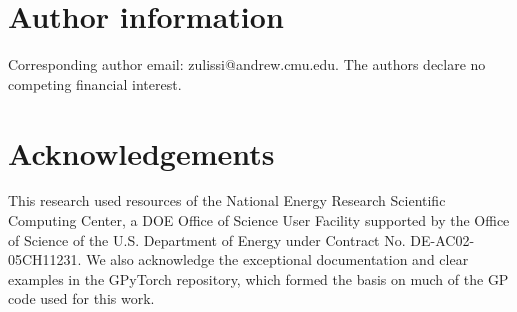 \documentclass[]{achemso}
\begin{document}
\section*{Author information} Corresponding author email:  zulissi@andrew.cmu.edu.
The authors declare no competing financial interest.

\section*{Acknowledgements} This research used resources of the National Energy Research Scientific Computing Center, a DOE Office of Science User Facility supported by the Office of Science of the U.S. Department of Energy under Contract No. DE-AC02-05CH11231. %
We also acknowledge the exceptional documentation and clear examples in the GPyTorch\cite{Gardner2018} repository, which formed the basis on much of the \gls{GP} code used for this work.



\clearpage

\end{document}
